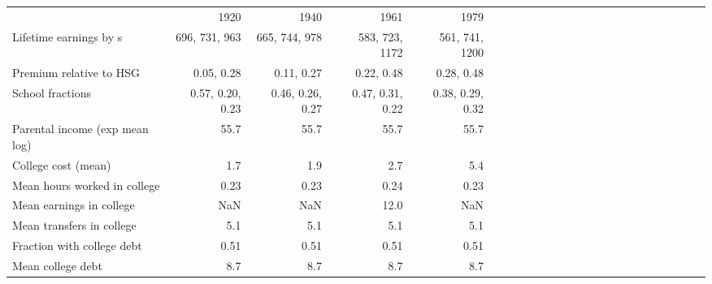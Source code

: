 \begin{tabular}{lrrrrrrrrrrrrrrrrrrrrrrr}
\hline
 & 1920  & 1940  & 1961  & 1979  &   &   &   &   &   &   &   &   &   &   &   &   &   &   &   &   &   &   &   \\
Lifetime earnings by s & 696, 731, 963  & 665, 744, 978  & 583, 723, 1172  & 561, 741, 1200  &   &   &   &   &   &   &   &   &   &   &   &   &   &   &   &   &   &   &   \\
Premium relative to HSG & 0.05, 0.28  & 0.11, 0.27  & 0.22, 0.48  & 0.28, 0.48  &   &   &   &   &   &   &   &   &   &   &   &   &   &   &   &   &   &   &   \\
School fractions & 0.57, 0.20, 0.23  & 0.46, 0.26, 0.27  & 0.47, 0.31, 0.22  & 0.38, 0.29, 0.32  &   &   &   &   &   &   &   &   &   &   &   &   &   &   &   &   &   &   &   \\
Parental income (exp mean log) & 55.7  & 55.7  & 55.7  & 55.7  &   &   &   &   &   &   &   &   &   &   &   &   &   &   &   &   &   &   &   \\
College cost (mean) & 1.7  & 1.9  & 2.7  & 5.4  &   &   &   &   &   &   &   &   &   &   &   &   &   &   &   &   &   &   &   \\
Mean hours worked in college & 0.23  & 0.23  & 0.24  & 0.23  &   &   &   &   &   &   &   &   &   &   &   &   &   &   &   &   &   &   &   \\
Mean earnings in college & NaN  & NaN  & 12.0  & NaN  &   &   &   &   &   &   &   &   &   &   &   &   &   &   &   &   &   &   &   \\
Mean transfers in college & 5.1  & 5.1  & 5.1  & 5.1  &   &   &   &   &   &   &   &   &   &   &   &   &   &   &   &   &   &   &   \\
Fraction with college debt & 0.51  & 0.51  & 0.51  & 0.51  &   &   &   &   &   &   &   &   &   &   &   &   &   &   &   &   &   &   &   \\
Mean college debt & 8.7  & 8.7  & 8.7  & 8.7  &   &   &   &   &   &   &   &   &   &   &   &   &   &   &   &   &   &   &   \\
\hline
\end{tabular}%
